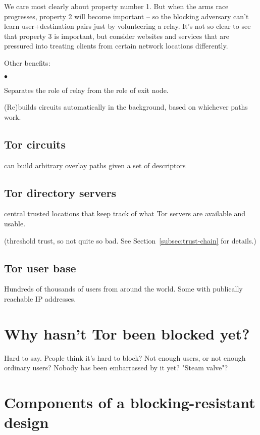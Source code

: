 \documentclass{llncs}
\newenvironment{tightlist}{\begin{list}{$\bullet$}{
  \setlength{\itemsep}{0mm}
    \setlength{\parsep}{0mm}
    }}{\end{list}}
\begin{document}
We care most clearly about property number 1. But when the arms race
progresses, property 2 will become important -- so the blocking adversary
can't learn user+destination pairs just by volunteering a relay. It's not so
clear to see that property 3 is important, but consider websites and
services that are pressured into treating clients from certain network
locations differently.

Other benefits:

\begin{tightlist}
\item Separates the role of relay from the role of exit node.

\item (Re)builds circuits automatically in the background, based on
whichever paths work.
\end{tightlist}

\subsection{Tor circuits}

can build arbitrary overlay paths given a set of descriptors~\cite{blossom}

\subsection{Tor directory servers}

central trusted locations that keep track of what Tor servers are
available and usable.

(threshold trust, so not quite so bad. See
Section~\ref{subsec:trust-chain} for details.)

\subsection{Tor user base}

Hundreds of thousands of users from around the world. Some with publically
reachable IP addresses.

\section{Why hasn't Tor been blocked yet?}

Hard to say. People think it's hard to block? Not enough users, or not
enough ordinary users? Nobody has been embarrassed by it yet? "Steam
valve"?




\section{Components of a blocking-resistant design}
\end{document}

